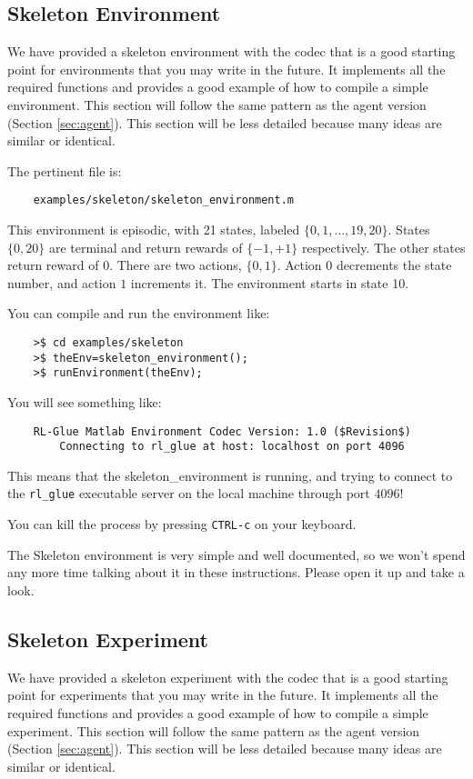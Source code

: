 \documentclass[11pt]{article}
\begin{document}
\subsection{Skeleton Environment}
\label{sec:env}

We have provided a skeleton environment with the codec that is a good starting point for environments that you may write in the future.
It implements all the required functions and provides a good example of how to compile a simple environment.  This section will follow the same 
pattern as the agent version (Section \ref{sec:agent}).  This section will be less detailed because many ideas are similar or identical.


The pertinent file is:
\begin{verbatim}
	examples/skeleton/skeleton_environment.m
\end{verbatim}

This environment is episodic, with 21 states, labeled $\{0, 1,\ldots,19,20\}$. States $\{0, 20\}$ are terminal and return rewards of $\{-1, +1\}$ respectively.  The other states return reward of $0$.
There are two actions, $\{0, 1\}$.  Action $0$ decrements the state number, and action $1$ increments it. The environment starts in state 10.

You can compile and run the environment like:
\begin{verbatim}
	>$ cd examples/skeleton
	>$ theEnv=skeleton_environment();
	>$ runEnvironment(theEnv);
\end{verbatim}

You will see something like:
\begin{verbatim}
	RL-Glue Matlab Environment Codec Version: 1.0 ($Revision$)
	    Connecting to rl_glue at host: localhost on port 4096
	\end{verbatim}

This means that the skeleton\_environment is running, and trying to connect to the \texttt{rl\_glue} executable server on the local machine through port $4096$! 

You can kill the process by pressing \texttt{CTRL-c} on your keyboard.

The Skeleton environment is very simple and well documented, so we won't spend any more time talking about it in these instructions.
Please open it up and take a look.


\subsection{Skeleton Experiment}
We have provided a skeleton experiment with the codec that is a good starting point for experiments that you may write in the future.
It implements all the required functions and provides a good example of how to compile a simple experiment.  This section will follow the same 
pattern as the agent version (Section \ref{sec:agent}).  This section will be less detailed because many ideas are similar or identical.
\end{document}
